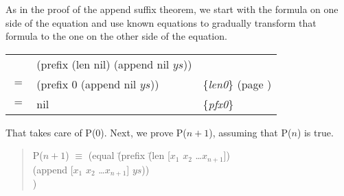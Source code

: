 As in the proof of the append suffix theorem, we start with the formula on one side of the equation and use known equations to gradually transform that formula to the one on the other side of the equation.

\begin{center}
\begin{tabular}{lll}
    & (prefix (len nil) (append nil $ys$))  &                                                      \\
$=$ & (prefix 0 (append nil $ys$))          & \{\emph{len0}\} (page \pageref{len-equations})   \\
$=$ & nil                                   & \{\emph{pfx0}\}                                      \\
\end{tabular}
\end{center}

That takes care of P(0). Next, we prove P($n+1$), assuming that P($n$) is true.

\begin{quote}
\begin{tabbing}
P($n+1$) $\equiv$ (equal \=(prefix \=(len [$x_1$ $x_2$ \dots $x_{n+1}$])        \\
                       \>        \>(append [$x_1$ $x_2$ \dots $x_{n+1}$] $ys$)) \\
                       \>[$x_1$ $x_2$ \dots $x_{n+1}$])                         \\
\end{tabbing}
\end{quote}


